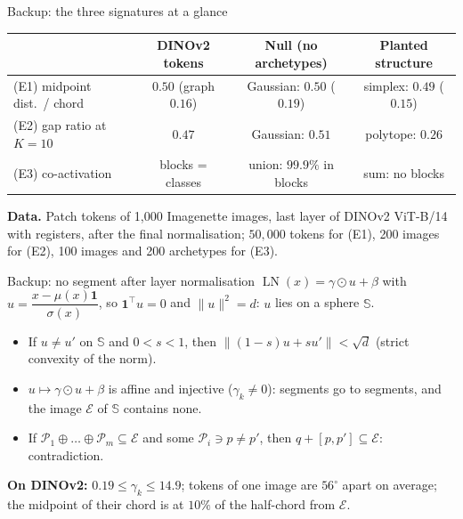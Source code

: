 \documentclass[aspectratio=169,10pt]{beamer}
\newcommand{\msum}{\oplus}
\newcommand{\cP}{\mathcal{P}}
\newcommand{\cE}{\mathcal{E}}
\newcommand{\LN}{\operatorname{LN}}
\begin{document}
\appendix
\begin{frame}{Backup: the three signatures at a glance}
  \centering\footnotesize
  \begin{tabular}{@{}lccc@{}}
    \toprule
    & DINOv2 tokens & Null (no archetypes) & Planted structure\\
    \midrule
    (E1) midpoint dist.\ / chord & $0.50$ (graph $0.16$) & Gaussian: $0.50$ ($0.19$) & simplex: $0.49$ ($0.15$)\\
    (E2) gap ratio at $K=10$ & $0.47$ & Gaussian: $0.51$ & polytope: $0.26$\\
    (E3) co-activation & blocks = classes & union: $99.9\%$ in blocks & sum: no blocks\\
    \bottomrule
  \end{tabular}
  \bigskip

  \raggedright
  \textbf{Data.} Patch tokens of 1,000 Imagenette images, last layer of DINOv2 ViT-B/14 with registers, after the
  final normalisation; $50{,}000$ tokens for (E1), 200 images for (E2), 100 images and 200 archetypes for (E3).
\end{frame}

\begin{frame}{Backup: no segment after layer normalisation}
  $\LN(x)=\gamma\odot u+\beta$ with $u=\dfrac{x-\mu(x)\mathbf 1}{\sigma(x)}$, so $\mathbf 1^\top u=0$ and $\|u\|^2=d$:
  $u$ lies on a sphere $\mathbb S$.\par\medskip
  \begin{itemize}
    \item If $u\neq u'$ on $\mathbb S$ and $0<s<1$, then $\|(1-s)u+su'\|<\sqrt d$ (strict convexity of the norm).
    \item $u\mapsto\gamma\odot u+\beta$ is affine and injective ($\gamma_k\neq0$): segments go to segments, and the
    image $\cE$ of $\mathbb S$ contains none.
    \item If $\cP_1\msum\dots\msum\cP_m\subseteq\cE$ and some $\cP_i\ni p\neq p'$, then $q+[p,p']\subseteq\cE$:
    contradiction.
  \end{itemize}
  \medskip
  \textbf{On DINOv2:} $0.19\le\gamma_k\le 14.9$; tokens of one image are $56^\circ$ apart on average; the midpoint of
  their chord is at $10\%$ of the half-chord from $\cE$.
\end{frame}
\end{document}
